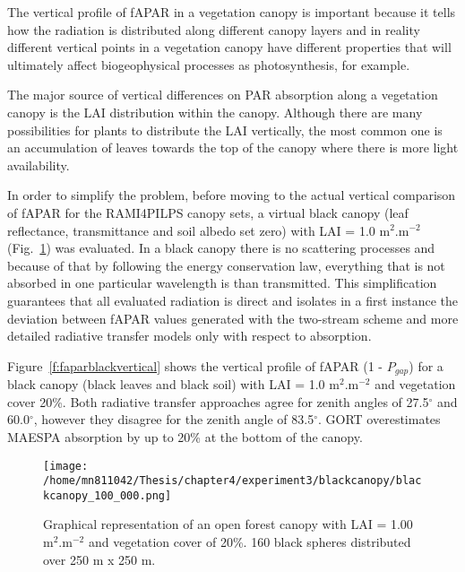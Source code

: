 The vertical profile of fAPAR in a vegetation canopy is important because it tells how the radiation is distributed along different canopy layers and in reality different vertical points in a vegetation canopy have different properties that will ultimately affect biogeophysical processes as photosynthesis, for example. 

The major source of vertical differences on PAR absorption along a vegetation canopy is the LAI distribution within the canopy. Although there are many possibilities for plants to distribute the LAI vertically, the most common one is an accumulation of leaves towards the top of the canopy where there is more light availability. 

In order to simplify the problem, before moving to the actual vertical comparison of fAPAR for the RAMI4PILPS canopy sets, a virtual black canopy (leaf reflectance,  transmittance and soil albedo set zero) with LAI = 1.0 m$^2$.m$^{-2}$  (Fig.~\ref{f:blackcanopy}) was evaluated. In a black canopy there is no scattering processes and because of that by following the energy conservation law, everything that is not absorbed in one particular wavelength is than transmitted. This simplification guarantees that all evaluated radiation is direct and isolates in a first instance the deviation between fAPAR values generated with the two-stream scheme and more detailed radiative transfer models only with respect to absorption. 

Figure~\ref{f:faparblackvertical} shows the vertical profile of fAPAR (1 - $P_{gap}$) for a black canopy (black leaves and black soil) with LAI = 1.0 m$^2$.m$^{-2}$ and vegetation cover 20\%. Both radiative transfer approaches agree for zenith angles of 27.5$^{\circ}$ and 60.0$^{\circ}$, however they disagree for the zenith angle of 83.5$^{\circ}$. GORT overestimates MAESPA absorption by up to 20\% at the bottom of the canopy. 

\begin{figure}
\centering
\texttt{[image: /home/mn811042/Thesis/chapter4/experiment3/blackcanopy/blackcanopy\_100\_000.png]}
\caption{Graphical representation of an open forest canopy with LAI = 1.00 m$^2$.m$^{-2}$ and vegetation cover of 20\%. 160 black spheres distributed over 250 m x 250 m.}
\label{f:blackcanopy}
\end{figure}

